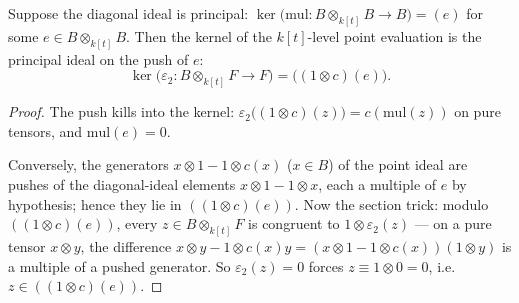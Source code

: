 \begin{theorem}
  \label{pa-thm:ker_pointEvTwo}
  \leanok

  Suppose the diagonal ideal is principal:
  \(\ker\bigl(\mathrm{mul} \colon B \otimes_{k[t]} B \to B\bigr) = (e)\) for some
  \(e \in B \otimes_{k[t]} B\). Then the kernel of the \(k[t]\)-level point evaluation is
  the principal ideal on the push of \(e\):
  \[
    \ker\bigl(\varepsilon_2 \colon B \otimes_{k[t]} F \to F\bigr)
      = \bigl((1 \otimes c)(e)\bigr).
  \]
\end{theorem}
\begin{proof}
  \leanok
  The push kills into the kernel: \(\varepsilon_2\bigl((1 \otimes c)(z)\bigr) =
  c(\mathrm{mul}(z))\) on pure tensors, and \(\mathrm{mul}(e) = 0\).

  Conversely, the generators \(x \otimes 1 - 1 \otimes c(x)\) (\(x \in B\)) of the point
  ideal are pushes of the diagonal-ideal elements \(x \otimes 1 - 1 \otimes x\), each a
  multiple of \(e\) by hypothesis; hence they lie in \(((1\otimes c)(e))\). Now the section
  trick: modulo \(((1\otimes c)(e))\), every \(z \in B \otimes_{k[t]} F\) is congruent to
  \(1 \otimes \varepsilon_2(z)\) — on a pure tensor \(x \otimes y\), the difference
  \(x \otimes y - 1 \otimes c(x)y = (x \otimes 1 - 1 \otimes c(x))(1 \otimes y)\) is a
  multiple of a pushed generator. So \(\varepsilon_2(z) = 0\) forces
  \(z \equiv 1 \otimes 0 = 0\), i.e.\ \(z \in ((1\otimes c)(e))\).
\end{proof}

